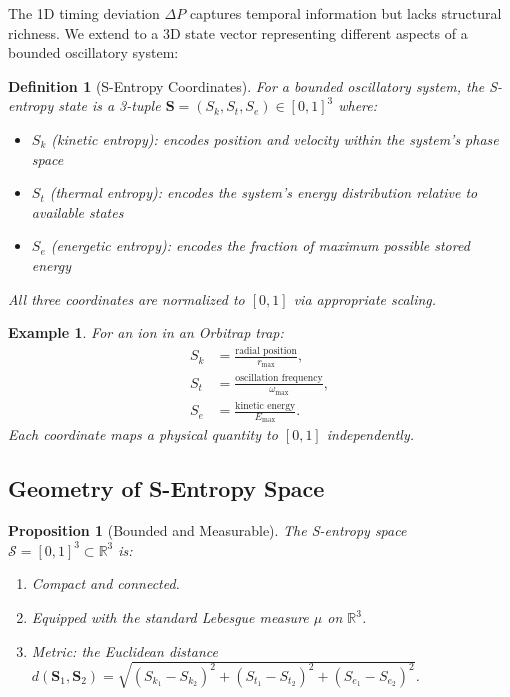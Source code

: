 \documentclass[twocolumn,11pt,a4paper]{article}
\newtheorem{proposition}[theorem]{Proposition}
\newtheorem{definition}[theorem]{Definition}
\newtheorem{example}[theorem]{Example}
\newcommand{\DP}{\Delta P}
\newcommand{\Sk}{S_k}
\newcommand{\St}{S_t}
\newcommand{\Se}{S_e}
\newcommand{\Stuple}{\mathbf{S}}
\newcommand{\calS}{\mathcal{S}}
\begin{document}
The 1D timing deviation $\DP$ captures temporal information but lacks structural richness. We extend to a 3D state vector representing different aspects of a bounded oscillatory system:

\begin{definition}[S-Entropy Coordinates]
For a bounded oscillatory system, the \emph{S-entropy state} is a 3-tuple $\Stuple = (\Sk, \St, \Se) \in [0,1]^3$ where:
\begin{itemize}[nosep,leftmargin=1em]
  \item $\Sk$ (kinetic entropy): encodes position and velocity within the system's phase space
  \item $\St$ (thermal entropy): encodes the system's energy distribution relative to available states
  \item $\Se$ (energetic entropy): encodes the fraction of maximum possible stored energy
\end{itemize}
All three coordinates are normalized to $[0,1]$ via appropriate scaling.
\end{definition}

\begin{example}
For an ion in an Orbitrap trap:
\begin{align}
\Sk &= \frac{\text{radial position}}{r_{\max}}, \\
\St &= \frac{\text{oscillation frequency}}{\omega_{\max}}, \\
\Se &= \frac{\text{kinetic energy}}{E_{\max}}.
\end{align}
Each coordinate maps a physical quantity to $[0,1]$ independently.
\end{example}

\subsection{Geometry of S-Entropy Space}

\begin{proposition}[Bounded and Measurable]
The S-entropy space $\calS = [0,1]^3 \subset \mathbb{R}^3$ is:
\begin{enumerate}[nosep,label=(\roman*)]
  \item Compact and connected.
  \item Equipped with the standard Lebesgue measure $\mu$ on $\mathbb{R}^3$.
  \item Metric: the Euclidean distance $d(\Stuple_1, \Stuple_2) = \sqrt{(\Sk_1 - \Sk_2)^2 + (\St_1 - \St_2)^2 + (\Se_1 - \Se_2)^2}$.
\end{enumerate}
\end{proposition}
\end{document}
